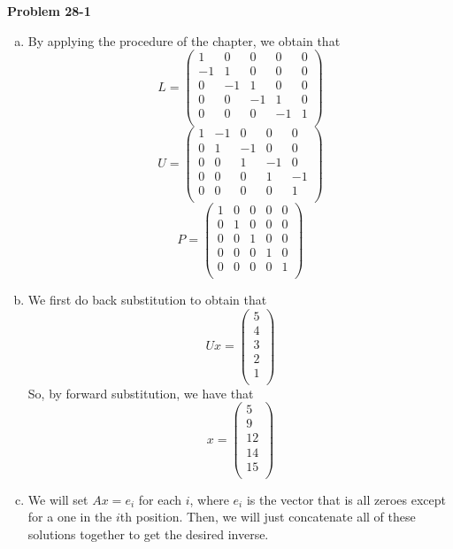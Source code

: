 \documentclass{article}
\begin{document}
\noindent\textbf{Problem 28-1}\\
\begin{enumerate}[a.]
\item
By applying the procedure of the chapter, we obtain that
\[
L = \left(\begin{array}{ccccc}
1&0&0&0&0\\
-1&1&0&0&0\\
0&-1&1&0&0\\
0&0&-1&1&0\\
0&0&0&-1&1\\
\end{array}\right)
\]
\[
U = \left(\begin{array}{ccccc}
1&-1&0&0&0\\
0&1&-1&0&0\\
0&0&1&-1&0\\
0&0&0&1&-1\\
0&0&0&0&1\\
\end{array}\right)
\]
\[
P = \left(\begin{array}{ccccc}
1&0&0&0&0\\
0&1&0&0&0\\
0&0&1&0&0\\
0&0&0&1&0\\
0&0&0&0&1\\
\end{array}\right)
\]

\item
We first do back substitution to obtain that
\[
Ux = \left(\begin{array}{c}
5\\
4\\
3\\
2\\
1\\
\end{array}\right)
\]
So, by forward substitution, we have that
\[
x = \left(\begin{array}{c}
5\\
9\\
12\\
14\\
15\\
\end{array}\right)
\]
\item
We will set $Ax = e_i$ for each $i$, where $e_i$ is the vector that is all zeroes except for a one in the $i$th position. Then, we will just concatenate all of these solutions together to get the desired inverse.


\end{enumerate}
\end{document}

